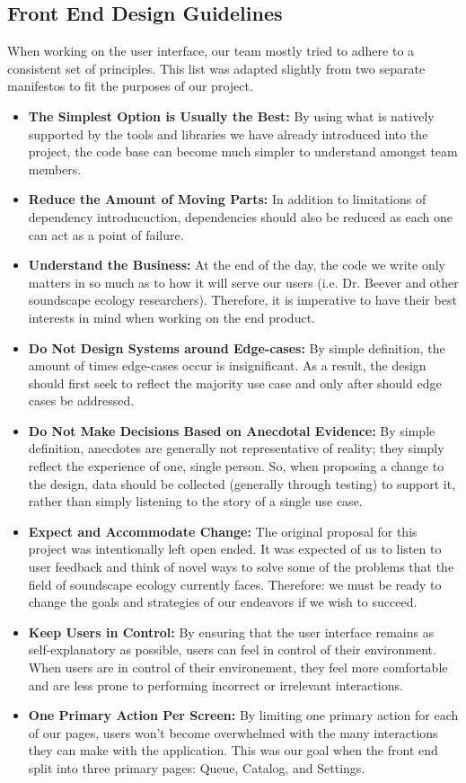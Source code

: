 \subsection{Front End Design Guidelines}
When working on the user interface, our team mostly tried to adhere to a consistent set of principles. This list was adapted slightly from two separate manifestos to fit the purposes of our project.\par

\begin{itemize}
\item \textbf{The Simplest Option is Usually the Best:} By using what is natively supported by the tools and libraries we have already introduced into the project, the code base can become much simpler to understand amongst team members.
\item \textbf{Reduce the Amount of Moving Parts:} In addition to limitations of dependency introducuction, dependencies should also be reduced as each one can act as a point of failure.
\item \textbf{Understand the Business:} At the end of the day, the code we write only matters in so much as to how it will serve our users (i.e. Dr. Beever and other soundscape ecology researchers). Therefore, it is imperative to have their best interests in mind when working on the end product.
\item \textbf{Do Not Design Systems around Edge-cases:} By simple definition, the amount of times edge-cases occur is insignificant. As a result, the design should first seek to reflect the majority use case and only after should edge cases be addressed.
\item \textbf{Do Not Make Decisions Based on Anecdotal Evidence:} By simple definition, anecdotes are generally not representative of reality; they simply reflect the experience of one, single person. So, when proposing a change to the design, data should be collected (generally through testing) to support it, rather than simply listening to the story of a single use case.
\item \textbf{Expect and Accommodate Change:} The original proposal for this project was intentionally left open ended. It was expected of us to listen to user feedback and think of novel ways to solve some of the problems that the field of soundscape ecology currently faces. Therefore: we must be ready to change the goals and strategies of our endeavors if we wish to succeed.
\item \textbf{Keep Users in Control:} By ensuring that the user interface remains as self-explanatory as possible, users can feel in control of their environment. When users are in control of their environement, they feel more comfortable and are less prone to performing incorrect or irrelevant interactions.
\item \textbf{One Primary Action Per Screen:} By limiting one primary action for each of our pages, users won't become overwhelmed with the many interactions they can make with the application. This was our goal when the front end split into three primary pages: Queue, Catalog, and Settings.
\end{itemize}
